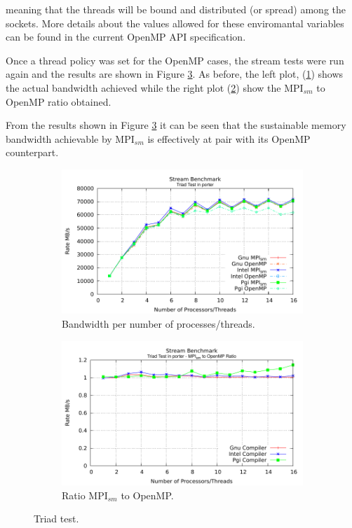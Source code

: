 meaning that the threads will be bound and distributed (or spread) among the sockets. More details about the values allowed for these enviromantal variables can be found in the current OpenMP API specification.

\medskip

Once a thread policy was set for the OpenMP cases, the stream tests were run again and the results are shown in Figure \ref{fig:TriadTest}. As before, the left plot, (\ref{fig:Triad}) shows the actual bandwidth achieved while the right plot (\ref{fig:TriadRatio}) show the MPI$_{sm}$ to OpenMP ratio obtained. 

\medskip
From the results shown in Figure \ref{fig:TriadTest} it can be seen that the sustainable memory bandwidth achievable by MPI$_{sm}$ is effectively at pair with its OpenMP counterpart.


\begin{figure} [h!]
    \centering
    \captionsetup{justification=centering, singlelinecheck=false}
    \begin{subfigure}{.6\textwidth}
      \centering
      \hspace*{-1.5cm} 
      \includegraphics[width=0.95\linewidth]{Plots/streamBenchmark/porter-Triad.pdf}
      \caption[]{Bandwidth per number of processes/threads.}
      \label{fig:Triad}
    \end{subfigure}%
    \begin{subfigure}{.6\textwidth}
      \centering
      \hspace*{-1.5cm} 
      \includegraphics[width=0.95\linewidth]{Plots/streamBenchmark/porter-TriadRatio.pdf}
      \caption{Ratio MPI$_{sm}$ to OpenMP.}
      \label{fig:TriadRatio}
    \end{subfigure}
\caption{Triad test.}
\label{fig:TriadTest}
\end{figure}

